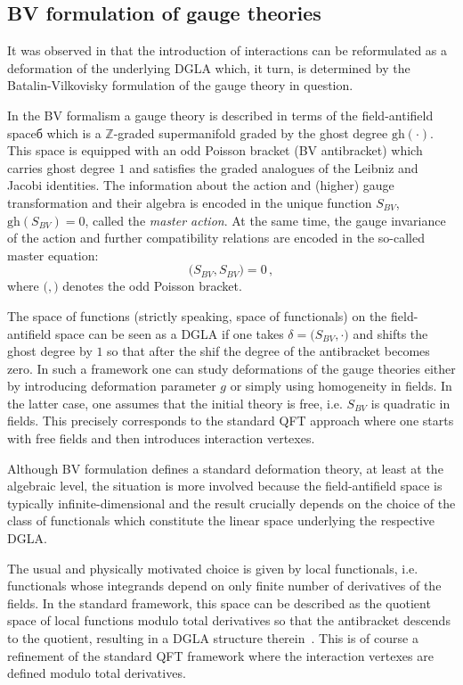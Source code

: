 \documentclass[a4paper,12pt]{article}
\numberwithin{equation}{section} %
\newcommand{\gh}[1]{\mathrm{gh}(#1)}
\newcommand{\ab}[2]{\big(#1,#2\big)}
\newcommand{\fZ}{\mathbb{Z}}
\begin{document}
\subsection{BV formulation of gauge theories}

It was observed in \cite{Barnich:1993vg} that the introduction of interactions can be reformulated as a deformation of the underlying DGLA which, it turn, is determined by the Batalin-Vilkovisky formulation of the gauge theory in question. 

In the BV formalism a gauge theory is described in terms of the field-antifield spaceб which is a $\fZ$-graded supermanifold graded by the ghost degree $\gh{\cdot}$. This space is equipped with an odd Poisson bracket (BV antibracket) which carries ghost degree $1$ and satisfies the graded analogues of the Leibniz and Jacobi identities. The information about the action and (higher) gauge transformation and their algebra is encoded in the unique function $S_{BV}$, $\gh{S_{BV}}=0$, called the \textit{master action}. At the same time, the gauge invariance of the action and further compatibility relations are encoded in the so-called master equation:
\begin{equation}
\ab{S_{BV}}{S_{BV}}=0\,,
\end{equation}
where $\ab{}{}$ denotes the odd Poisson bracket.

The space of functions (strictly speaking, space of functionals) on the field-antifield space can be seen as a DGLA if one takes $\delta=\ab{S_{BV}}{\cdot}$ and shifts the ghost degree by $1$ so that after the shif the degree of the antibracket becomes zero. In such a framework  one can study deformations of the gauge theories either by introducing deformation parameter $g$ or simply using homogeneity in fields. In the latter case, one assumes that the initial theory is free, i.e. $S_{BV}$ is quadratic in fields. This precisely corresponds to the standard QFT approach where one starts with free fields and then introduces interaction vertexes.

Although BV formulation defines a standard deformation theory, at least at the algebraic level, the situation is more involved because the field-antifield space is typically infinite-dimensional and the result crucially depends on the choice of the class of functionals which constitute the linear space underlying the respective DGLA.

The usual and  physically motivated choice is given by local functionals, i.e. functionals whose integrands depend on only finite number of derivatives of the fields. In the standard framework, this space can be described as the quotient space of local functions modulo total derivatives so that the antibracket descends to the quotient, resulting in a DGLA structure therein~\cite{Barnich:1997ed}. This is of course a refinement of the standard QFT framework where the interaction vertexes are defined modulo total derivatives. 
\end{document}
